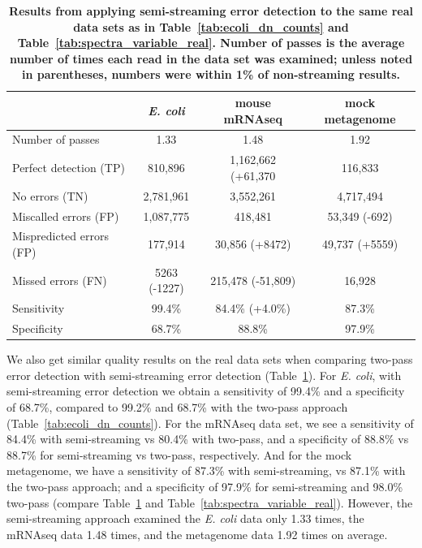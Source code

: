 \documentclass{article}
\begin{document}
\begin{table}
\begin{tabular}{|l|c||c||c|}
\hline
& {\bf \em E. coli} & {\bf mouse mRNAseq} & {\bf mock metagenome} \\
\hline
Number of passes         & 1.33      & 1.48         & 1.92 \\
\hline
Perfect detection (TP)   & 810,896   & 1,162,662 (+61,370 & 116,833  \\
No errors (TN)           & 2,781,961 & 3,552,261  & 4,717,494 \\
Miscalled errors (FP)    & 1,087,775 & 418,481    & 53,349 (-692)  \\
Mispredicted errors (FP) & 177,914   & 30,856 (+8472)    & 49,737 (+5559)  \\
Missed errors (FN)       & 5263 (-1227)     & 215,478 (-51,809)  & 16,928  \\
\hline
Sensitivity            & 99.4\%      & 84.4\% (+4.0\%)     & 87.3\%  \\
Specificity            & 68.7\%      & 88.8\%     & 97.9\%  \\
\hline
\end{tabular}
\caption{{\bf Results from applying semi-streaming error detection to the same
  real data sets as in Table~\ref{tab:ecoli_dn_counts} and
  Table~\ref{tab:spectra_variable_real}.  Number of passes is the average
  number of times each read in the data set was examined; unless noted in
  parentheses, numbers were within 1\% of non-streaming results.}}
\label{tab:spectra_streaming_real}

\end{table}

We also get similar quality results on the real data sets when
comparing two-pass error detection with semi-streaming error detection
(Table~\ref{tab:spectra_streaming_real}).  For {\em E. coli}, with
semi-streaming error detection we obtain a sensitivity of 99.4\% and a
specificity of 68.7\%, compared to 99.2\% and 68.7\% with the two-pass
approach (Table~\ref{tab:ecoli_dn_counts}).  For the mRNAseq data set,
we see a sensitivity of 84.4\% with semi-streaming vs 80.4\% with two-pass,
and a specificity of 88.8\% vs 88.7\% for semi-streaming vs two-pass,
respectively.  And for the mock metagenome, we have a sensitivity of
87.3\% with semi-streaming, vs 87.1\% with the two-pass approach; and a
specificity of 97.9\% for semi-streaming and 98.0\% two-pass (compare
Table~\ref{tab:spectra_streaming_real} and
Table~\ref{tab:spectra_variable_real}).  However, the semi-streaming
approach examined the {\em E. coli} data only 1.33 times, the mRNAseq
data 1.48 times, and the metagenome data 1.92 times on average.
\end{document}
